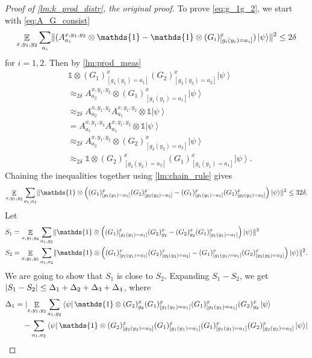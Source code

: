 \documentclass[11pt]{article}
\theoremstyle{plain}
\theoremstyle{definition}
\DeclarePairedDelimiter{\norm}{\lVert}{\rVert}
\DeclarePairedDelimiter{\abs}{\lvert}{\rvert}
\newcommand {\bra} [1] {\ensuremath{ \left\langle #1 \right| }}
\newcommand {\ket} [1] {\ensuremath{ \left| #1 \right\rangle }}
\DeclareMathOperator*{\bigE}{\mathbb{E}}
\newcommand {\id} {\ensuremath{\mathds{1}}}
\newcommand{\x}{\otimes}
\newcommand{\appd}[1]{\approx_{#1}}
\newcommand{\1}{\mathbb{1}} %
\begin{document}
\begin{proof}[Proof of \cref{lm:k_prod_distr}, the original proof]
	To prove \cref{eq:g_1g_2}, we start with \cref{eq:A_G_consist}
	\begin{align*}
		\bigE_{x,y_1,y_2} \sum_{a_i} \norm{ (A^{x,y_1,y_2}_{a_i} \x\id - \id\x (G_i)^x_{[g_i(y_i)=a_i]})\ket{\psi}}^2 \leq 2\delta
	\end{align*}
	for $i= 1,2$.
	Then by \cref{lm:prod_meas}
	\begin{align*}
		&\id \x (G_1)^x_{[g_1(y_1)=a_1]} (G_2)^x_{[g_2(y_2)=a_2]}  \ket{\psi} \\
		&\appd{2\delta} A^{x,y_1,y_2}_{a_2} \x  (G_1)^x_{[g_1(y_1)=a_1]}  \ket{\psi} \\
		&\appd{2\delta}  A^{x,y_1,y_2}_{a_2} A^{x,y_1,y_2}_{a_1} \x \id \ket{\psi} \\
		&= A^{x,y_1,y_2}_{a_1} A^{x,y_1,y_2}_{a_1} \x \id \ket{\psi} \\
		&\appd{2\delta}  A^{x,y_1,y_2}_{a_2} \x (G_2)^x_{[g_2(y_2)=a_2]} \ket{\psi} \\
		&\appd{2\delta} \id \x  (G_2)^x_{[g_2(y_2)=a_2]} (G_1)^x_{[g_1(y_1)=a_1]} \ket{\psi}.
	\end{align*}
	Chaining the inequalities together using \cref{lm:chain_rule} gives
	\begin{align*}
		\bigE_{x,y_1,y_2} \sum_{a_1,a_2} \norm{ \id \x  \left( (G_1)^x_{[g_1(y_1)=a_1]} (G_2)^x_{[g_2(y_2)=a_2]} - (G_1)^x_{[g_1(y_1)=a_1]} (G_2)^x_{[g_2(y_2)=a_2]} \right)  \ket{\psi}}^2 \leq 32 \delta.
	\end{align*}
	Let 
	\begin{align*}
	S_1 &= \bigE_{x,y_1,y_2} \sum_{a_1, g_2} \norm{ \id \x \left((G_1)^x_{[g_1(y_1) = a_1]}(G_2)^x_{g_2} - (G_2)^x_{g_2}(G_1)^x_{[g_1(y_1) = a_1]}\right) \ket{\psi}}^2 \\
	S_2 &= \bigE_{x,y_1,y_2} \sum_{a_1,a_2} \norm{ \id \x \left( (G_1)^x_{[g_1(y_1)=a_1]} (G_2)^x_{[g_2(y_2)=a_2]} - (G_1)^x_{[g_1(y_1)=a_1]} (G_2)^x_{[g_2(y_2)=a_2]} \right)  \ket{\psi}}^2.
	\end{align*}
	We are going to show that $S_1$ is close to $S_2$. 
	Expanding $S_1 - S_2$, we get $\abs{ S_1 - S_2 } \leq \Delta_1 + \Delta_2 + \Delta_3 + \Delta_4$,
	where
	\begin{align*}
		\Delta_1 &=\abs{ \bigE_{x,y_1,y_2} \sum_{a_1, g_2}
		\bra{\psi} \id \x  (G_2)^x_{g_2} (G_1)^x_{[g_1(y_1) = a_1]} (G_1)^x_{[g_1(y_1) = a_1]} (G_2)^x_{g_2}  \ket{\psi} \\ 
		&\quad -
		 \sum_{a_1, a_2} \bra{\psi}  \id \x (G_2)^x_{[g_2(y_2) = a_2]} 
		(G_1)^x_{[g_1(y_1) = a_1]} (G_1)^x_{[g_1(y_1) = a_1]} (G_2)^x_{[g_2(y_2) = a_2]}  \ket{\psi}} \\

\end{align*}
\end{proof}
\end{document}
